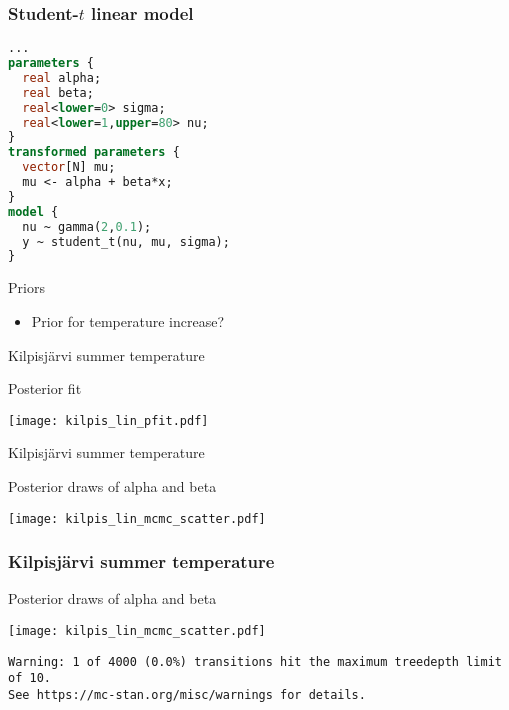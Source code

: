 \documentclass[finnish,english,t]{beamer}
\begin{document}
\begin{frame}[fragile]
  \frametitle{Student-$t$ linear model}
  {\small
  \begin{lstlisting}[language=Stan]
...
parameters {
  real alpha; 
  real beta; 
  real<lower=0> sigma;
  real<lower=1,upper=80> nu;
}
transformed parameters {
  vector[N] mu;
  mu <- alpha + beta*x;
}
model {
  nu ~ gamma(2,0.1); 
  y ~ student_t(nu, mu, sigma);
}
  \end{lstlisting}
}
\end{frame} 

\begin{frame}{Priors}

  \begin{itemize}
  \item Prior for temperature increase?
  \end{itemize}

\end{frame}

\begin{frame}{Kilpisjärvi summer temperature}

  Posterior fit
  
  \begin{center}
    \texttt{[image: kilpis\_lin\_pfit.pdf]}
  \end{center}

\end{frame}

\begin{frame}{Kilpisjärvi summer temperature}

  Posterior draws of alpha and beta
  
  \begin{center}
    \texttt{[image: kilpis\_lin\_mcmc\_scatter.pdf]}
  \end{center}
 
\end{frame}

\begin{frame}[fragile]
  \frametitle{Kilpisjärvi summer temperature}
  
  Posterior draws of alpha and beta
  
  \begin{center}
    \texttt{[image: kilpis\_lin\_mcmc\_scatter.pdf]}
  \end{center}

{\scriptsize
\begin{lstlisting}
Warning: 1 of 4000 (0.0%) transitions hit the maximum treedepth limit of 10.
See https://mc-stan.org/misc/warnings for details.
\end{lstlisting}
}
  
\end{frame}
\end{document}
